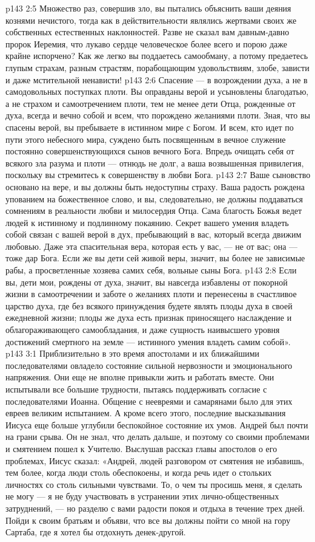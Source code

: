 \vs p143 2:5 Множество раз, совершив зло, вы пытались объяснить ваши деяния кознями нечистого, тогда как в действительности являлись жертвами своих же собственных естественных наклонностей. Разве не сказал вам давным\hyp{}давно пророк Иеремия, что лукаво сердце человеческое более всего и порою даже крайне испорчено? Как же легко вы поддаетесь самообману, а потому предаетесь глупым страхам, разным страстям, порабощающим удовольствиям, злобе, зависти и даже мстительной ненависти!
\vs p143 2:6 Спасение --- в возрождении духа, а не в самодовольных поступках плоти. Вы оправданы верой и усыновлены благодатью, а не страхом и самоотречением плоти, тем не менее дети Отца, рожденные от духа, всегда и вечно  собой и всем, что порождено желаниями плоти. Зная, что вы спасены верой, вы пребываете в истинном мире с Богом. И всем, кто идет по пути этого небесного мира, суждено быть посвященным в вечное служение постоянно совершенствующихся сынов вечного Бога. Впредь очищать себя от всякого зла разума и плоти --- отнюдь не долг, а ваша возвышенная привилегия, поскольку вы стремитесь к совершенству в любви Бога.
\vs p143 2:7 Ваше сыновство основано на вере, и вы должны быть недоступны страху. Ваша радость рождена упованием на божественное слово, и вы, следовательно, не должны поддаваться сомнениям в реальности любви и милосердия Отца. Сама благость Божья ведет людей к истинному и подлинному покаянию. Секрет вашего умения владеть собой связан с вашей верой в дух, пребывающий в вас, который всегда движим любовью. Даже эта спасительная вера, которая есть у вас, --- не от вас; она --- тоже дар Бога. Если же вы дети сей живой веры, значит, вы более не зависимые рабы, а просветленные хозяева самих себя, вольные сыны Бога.
\vs p143 2:8 Если вы, дети мои, рождены от духа, значит, вы навсегда избавлены от покорной жизни в самоотречении и заботе о желаниях плоти и перенесены в счастливое царство духа, где без всякого принуждения будете являть плоды духа в своей ежедневной жизни; плоды же духа есть признак приносящего наслаждение и облагораживающего самообладания, и даже сущность наивысшего уровня достижений смертного на земле --- истинного умения владеть самим собой».
\vs p143 3:1 Приблизительно в это время апостолами и их ближайшими последователями овладело состояние сильной нервозности и эмоционального напряжения. Они еще не вполне привыкли жить и работать вместе. Они испытывали все большие трудности, пытаясь поддерживать согласие с последователями Иоанна. Общение с неевреями и самарянами было для этих евреев великим испытанием. А кроме всего этого, последние высказывания Иисуса еще больше углубили беспокойное состояние их умов. Андрей был почти на грани срыва. Он не знал, что делать дальше, и поэтому со своими проблемами и смятением пошел к Учителю. Выслушав рассказ главы апостолов о его проблемах, Иисус сказал: «Андрей, людей разговором от смятения не избавишь, тем более, когда люди столь обеспокоены, и когда речь идет о стольких личностях со столь сильными чувствами. То, о чем ты просишь меня, я сделать не могу --- я не буду участвовать в устранении этих лично\hyp{}общественных затруднений, --- но разделю с вами радости покоя и отдыха в течение трех дней. Пойди к своим братьям и объяви, что все вы должны пойти со мной на гору Сартаба, где я хотел бы отдохнуть денек\hyp{}другой.
